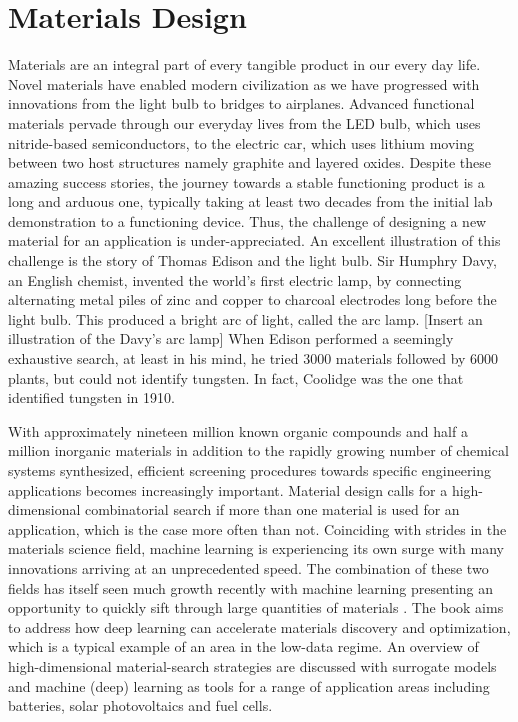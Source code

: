 \documentclass[book.tex]{subfiles}
\begin{document}
\section{Materials Design}

Materials are an integral part of every tangible product in our every day life.  Novel materials have enabled modern civilization as we have progressed with innovations from the light bulb to bridges to airplanes.  Advanced functional materials pervade through our everyday lives from the LED bulb, which uses nitride-based semiconductors, to the electric car, which uses lithium moving between two host structures namely graphite and layered oxides.  Despite these amazing success stories, the journey towards a stable functioning product is a long and arduous one, typically taking at least two decades from the initial lab demonstration to a functioning device.  Thus, the challenge of designing a new material for an application is under-appreciated.  
An excellent illustration of this challenge is the story of Thomas Edison and the light bulb. Sir Humphry Davy, an English chemist, invented the world's first electric lamp, by connecting alternating metal piles of zinc and copper to charcoal electrodes long before the light bulb.  This produced a bright arc of light, called the arc lamp. [Insert an illustration of the Davy's arc lamp] When Edison performed a seemingly exhaustive search, at least in his mind, he tried 3000 materials followed by 6000 plants, but could not identify tungsten. In fact, Coolidge was the one that identified tungsten in 1910. 

 With approximately nineteen million known organic compounds and half a million inorganic materials in addition to the rapidly growing number of chemical systems synthesized, efficient screening procedures towards specific engineering applications becomes increasingly important. Material design calls for a high-dimensional combinatorial search if more than one material is used for an application, which is the case more often than not. Coinciding with strides in the materials science field, machine learning is experiencing its own surge with many innovations arriving at an unprecedented speed. The combination of these two fields has itself seen much growth recently with machine learning presenting an opportunity to quickly sift through large quantities of materials \cite{Butler2018MachineScience, Ramprasad2017MachineProspects}.
 The book aims to address how deep learning can accelerate materials discovery and optimization, which is a typical example of an area in the low-data regime. An overview of high-dimensional material-search strategies are discussed with surrogate models and machine (deep) learning as tools for a range of application areas including batteries, solar photovoltaics and fuel cells. 
\end{document}
